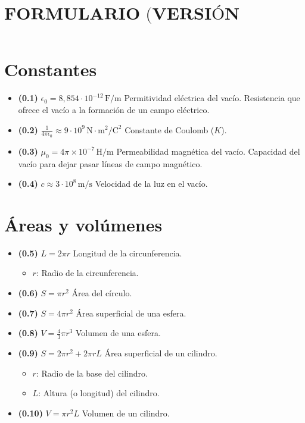 \documentclass{article}
\title{$\boxed{\textbf{FORMULARIO (VERSIÓN EXTENDIDA)}}$}
\begin{document}
	\maketitle

	\section*{Constantes}
		\begin{itemize}
			\item \textbf{(0.1)} $\boxed{\epsilon_{0}=8,854\cdot10^{-12}\,\text{F/m}}$ Permitividad eléctrica del vacío. Resistencia que ofrece el vacío a la formación de un campo eléctrico.
			\item \textbf{(0.2)} $\boxed{\frac{1}{4\pi\epsilon_{0}} \approx 9\cdot10^{9}\,\text{N}\cdot\text{m}^{2}/\text{C}^{2}}$ Constante de Coulomb ($K$).
			\item \textbf{(0.3)} $\boxed{\mu_{0}=4\pi\times10^{-7}\,\text{H/m}}$ Permeabilidad magnética del vacío. Capacidad del vacío para dejar pasar líneas de campo magnético.
			\item \textbf{(0.4)} $\boxed{c \approx 3\cdot10^{8}\,\text{m/s}}$ Velocidad de la luz en el vacío.
		\end{itemize}

	\section*{Áreas y volúmenes}
		\begin{itemize}
			\item \textbf{(0.5)} $\boxed{L=2\pi r}$ Longitud de la circunferencia.
				\begin{itemize}
					\item $r$: Radio de la circunferencia.
				\end{itemize}
			\item \textbf{(0.6)} $\boxed{S=\pi r^{2}}$ Área del círculo.
			\item \textbf{(0.7)} $\boxed{S=4\pi r^{2}}$ Área superficial de una esfera.
			\item \textbf{(0.8)} $\boxed{V=\frac{4}{3}\pi r^{3}}$ Volumen de una esfera.
			\item \textbf{(0.9)} $\boxed{S=2\pi r^{2}+2\pi rL}$ Área superficial de un cilindro.
				\begin{itemize}
					\item $r$: Radio de la base del cilindro.
					\item $L$: Altura (o longitud) del cilindro.
				\end{itemize}
			\item \textbf{(0.10)} $\boxed{V=\pi r^{2}L}$ Volumen de un cilindro.
		\end{itemize}
\end{document}
